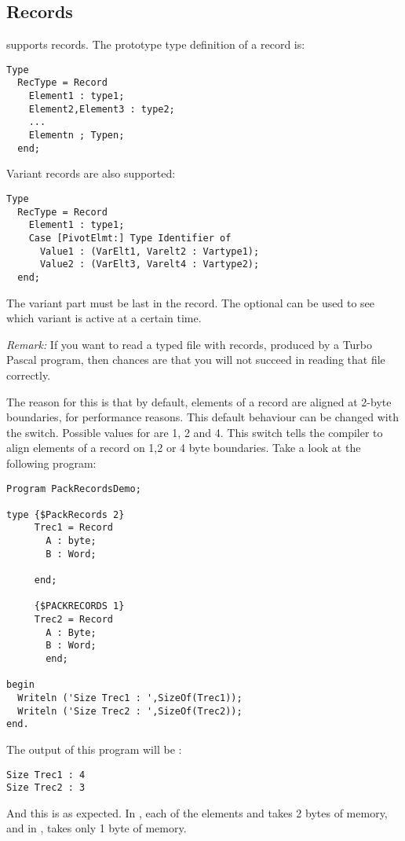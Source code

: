 \documentclass{report}
\begin{document}
\subsection{Records}

\fpc supports records. The prototype type definition of a record is:
\begin{verbatim}
Type
  RecType = Record
    Element1 : type1;
    Element2,Element3 : type2;
    ...
    Elementn ; Typen;
  end;
\end{verbatim}
Variant records are also supported:
\begin{verbatim}
Type
  RecType = Record
    Element1 : type1;
    Case [PivotElmt:] Type Identifier of
      Value1 : (VarElt1, Varelt2 : Vartype1);
      Value2 : (VarElt3, Varelt4 : Vartype2);
  end;
\end{verbatim}
The variant part must be last in the record. The optional 
can be used to see which variant is active at a certain time.

{\em Remark:} If you want to read a typed file with records, produced by
a Turbo Pascal program, then chances are that you will not succeed in
reading that file correctly. 

The reason for this is that by default, elements of a record are aligned at
2-byte boundaries, for performance reasons. This default behaviour can be
changed with the  switch. Possible values for
 are 1, 2 and 4. This switch tells the compiler to align elements of
a record on 1,2 or 4 byte boundaries. Take a look at the following program:
\begin{CodEx}
\begin{verbatim}
Program PackRecordsDemo;

type {$PackRecords 2}
     Trec1 = Record
       A : byte;
       B : Word;
       
     end;
     
     {$PACKRECORDS 1}
     Trec2 = Record
       A : Byte;
       B : Word;
       end;

begin
  Writeln ('Size Trec1 : ',SizeOf(Trec1));
  Writeln ('Size Trec2 : ',SizeOf(Trec2));
end.
\end{verbatim}
\end{CodEx}
The output of this program will be :
\begin{verbatim}
Size Trec1 : 4
Size Trec2 : 3
\end{verbatim}
And this is as expected. In , each of the elements  and
 takes 2 bytes of memory, and in  ,  takes only 1
byte of memory.
\end{document}
